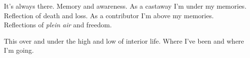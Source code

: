 

It's always there.  Memory and awareness.  As a castaway I'm under my
memories.  Reflection of death and loss.  As a contributor I'm above
my memories.  Reflections of {\it plein air} and freedom.  

This over and under the high and low of interior life.  Where I've
been and where I'm going.

\bye
